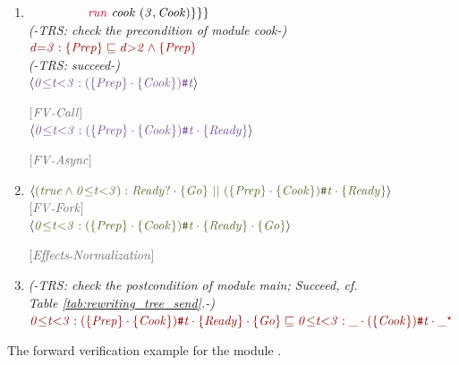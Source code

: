 \documentclass[acmsmall,10pt,review]{acmart}
\newcommand{\key}[1]{\textcolor{purple}{\code{#1}}}
\newcommand{\siderule}[1]{
\code{\footnotesize{\textcolor{mGray}{#1}}}}
\newcommand{\code}[1]{{\tt{\ensuremath{\m{#1}}}}}
\newcommand{\CONTAIN}{\sqsubseteq}
\newcommand{\m}{\mathit}
\newcommand{\mysharp}{{\mathrel{\texttt{\#}}}}
\newcommand\tabref[1]{Table \textcolor{black}{\ref{#1}}.}
\begin{document}
{\begin{figure}[ht]
\begin{minipage}[c]{\columnwidth}
{\begin{enumerate}
  \item      \code{~\qquad \ \qquad \key{run}\ cook\ (3, Cook) 
     \}\}\}}
      \\
                     \textcolor{mGray}{\emph{(-TRS: check the  precondition of module cook-) }} \\
              \code{  \textcolor{darkred}{d{=}3 : \{Prep\}  \CONTAIN  d{>}2 \wedge \{Prep\}} }   \\
             
               \textcolor{mGray}{\emph{(-TRS: succeed-) }}
      \\
     \code{\langle  \textcolor{darklavender}{ 0{\leq}t {<}3 : (\{Prep\}\cdot \{Cook\})\mysharp  t}  \rangle } 
     \siderule{ [FV\text{-}Call]}
      \\
     \code{\langle  \textcolor{darklavender}{ 0{\leq}t {<}3 : (\{Prep\}\cdot \{Cook\})\mysharp  t \cdot \{ Ready\}}  \rangle } 
     \siderule{ [FV\text{-}Async]}
     \\ \item
                   \code{\langle \textcolor{huntergreen}{(true \wedge 0{\leq}t {<}3) :  Ready? \cdot\{Go\}  \ || \  (\{Prep\}\cdot \{Cook\})\mysharp  t \cdot \{ Ready\}} \rangle }   \siderule{ [FV\text{-}Fork]} 
        \\ 
         \code{\langle \textcolor{huntergreen}{0{\leq}t {<}3 : (\{Prep\}\cdot \{Cook\})\mysharp  t \cdot \{ Ready\} \cdot \{Go\}} \rangle }
         \siderule{ [Effects\text{-}Normalization]} 
         \\
              \item 
               \textcolor{mGray}{  \emph{(-TRS: check the  postcondition of module main; Succeed, cf. \tabref{tab:rewriting_tree_send}-) }}\\
                  \code{  \textcolor{darkred}{
{0 {\leq} t {<}3} : (\{Prep\}\cdot \{Cook\})\mysharp  t \cdot \{ Ready\} \cdot \{Go\}
 \CONTAIN {0 {\leq} t  {<}3} : \_\cdot (\{Cook\})\mysharp  t \cdot\_^\star} 
                  }    \\
     
\end{enumerate}}

     \end{minipage}
      \vspace{0mm}
      \caption{The forward verification example for the module {}. }\label{fig:forward_example}
      \vspace{-1mm}
\end{figure}
}
\end{document}
